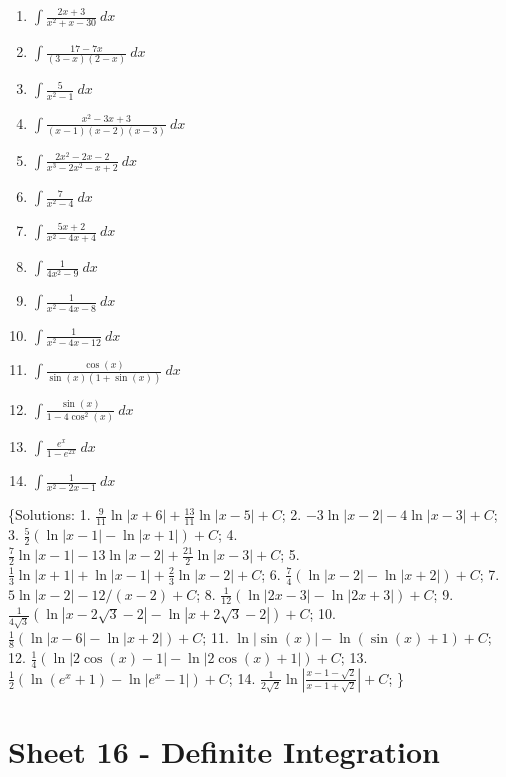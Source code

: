 \documentclass[
  11pt,
  oneside]{book}
\providecommand{\tightlist}{%
  \setlength{\itemsep}{0pt}\setlength{\parskip}{0pt}}
\newcommand{\slide}{}
\theoremstyle{definition}
\theoremstyle{definition}
\theoremstyle{definition}
\theoremstyle{definition}
\theoremstyle{remark}
\begin{document}
\begin{enumerate}
\def\labelenumi{\arabic{enumi}.}
\tightlist
\item
  \(\displaystyle\int \frac{2x+3}{x^2+x-30}\ dx\)
\item
  \(\displaystyle\int \frac{17-7x}{(3-x)(2-x)}\ dx\)
\item
  \(\displaystyle\int \frac{5}{x^2-1}\ dx\)
\item
  \(\displaystyle\int \frac{x^2-3x+3}{(x-1)(x-2)(x-3)}\ dx\)
\item
  \(\displaystyle\int \frac{2x^2-2x-2}{x^3-2x^2-x+2}\ dx\)
\item
  \(\displaystyle\int \frac{7}{x^2-4}\ dx\)
\item
  \(\displaystyle\int \frac{5x+2}{x^2-4x+4}\ dx\)
\item
  \(\displaystyle\int \frac{1}{4x^2-9}\ dx\)
\item
  \(\displaystyle\int \frac{1}{x^2-4x-8}\ dx\)
\item
  \(\displaystyle\int \frac{1}{x^2-4x-12}\ dx\)
\item
  \(\displaystyle\int \frac{\cos(x)}{\sin(x)(1+\sin(x))}\ dx\)
\item
  \(\displaystyle\int \frac{\sin(x)}{1-4\cos^2(x)}\ dx\)
\item
  \(\displaystyle\int \frac{e^x}{1-e^{2x}}\ dx\)
\item
  \(\displaystyle\int \frac{1}{x^2-2x-1}\ dx\)
\end{enumerate}

\{Solutions:
1. \(\frac{9}{11}\ln|x+6| + \frac{13}{11}\ln|x-5|+C\);
2. \(-3\ln|x-2|-4\ln|x-3| + C\);
3. \(\frac{5}{2}(\ln|x-1|-\ln|x+1|)+C\);
4. \(\frac{7}{2}\ln|x-1| -13\ln|x-2|+\frac{21}{2}\ln|x-3|+C\);
5. \(\frac{1}{3}\ln|x+1|+\ln|x-1|+\frac{2}{3}\ln|x-2|+C\);
6. \(\frac{7}{4}(\ln|x-2|-\ln|x+2|) +C\);
7. \(5\ln|x-2| - 12/(x-2) +C\);
8. \(\frac{1}{12}(\ln|2x-3|-\ln|2x+3|)+C\);
9. \(\frac{1}{4\sqrt{3}}\left( \ln|x-2\sqrt{3}-2| - \ln|x+2\sqrt{3}-2| \right)+C\);
10. \(\frac{1}{8}(\ln|x-6|-\ln|x+2|) +C\);
11. \(\ln|\sin(x)| - \ln(\sin(x)+1) + C\);
12. \(\frac{1}{4}\left( \ln|2\cos(x)-1| -\ln|2\cos(x)+1| \right) +C\);
13. \(\frac{1}{2}\left( \ln(e^x+1) - \ln|e^x-1| \right) + C\);
14. \(\frac{1}{2\sqrt{2}}\ln\left|\frac{x-1-\sqrt{2}}{x-1+\sqrt{2}}\right| +C\);
\}

\slide

\section{Sheet 16 - Definite Integration}\label{sheet-16---definite-integration}
\end{document}
